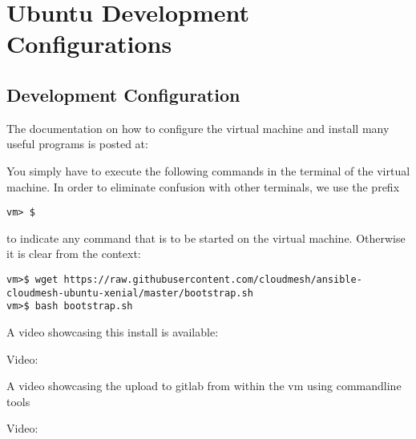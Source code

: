 \section{Ubuntu Development Configurations}

\subsection{Development Configuration}

The documentation on how to configure the virtual machine and install many useful programs is posted at:


You simply have to execute the following commands in the terminal of the virtual machine. In order to eliminate confusion with other terminals, we use the prefix 
\begin{verbatim}
vm> $ 
\end{verbatim}

to indicate any command that is to be started on the virtual machine. Otherwise it is clear from the context:

\begin{lstlisting}
vm>$ wget https://raw.githubusercontent.com/cloudmesh/ansible-cloudmesh-ubuntu-xenial/master/bootstrap.sh
vm>$ bash bootstrap.sh
\end{lstlisting} 

A video showcasing this install is available:

Video: 

A video showcasing the upload to gitlab from within the vm using commandline tools

Video: 
